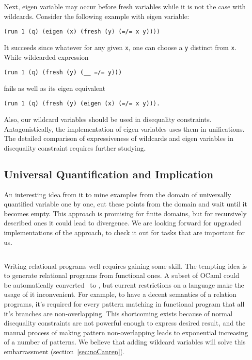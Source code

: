 Next, eigen variable may occur before fresh variables while it is not the case with wildcards.
Consider the following example with eigen variable: 
\begin{lstlisting}[xleftmargin=0.5cm]
(run 1 (q) (eigen (x) (fresh (y) (=/= x y))))
\end{lstlisting}
It succeeds since whatever for any given \lstinline{x}, one can choose a \lstinline{y} distinct from \lstinline{x}.
While wildcarded expression 
\begin{lstlisting}[xleftmargin=1cm]
(run 1 (q) (fresh (y) (__ =/= y)))
\end{lstlisting}
fails as well as its eigen equivalent 
\begin{lstlisting}[xleftmargin=0.5cm]
(run 1 (q) (fresh (y) (eigen (x) (=/= x y))).
\end{lstlisting}

Also, our wildcard variables should be used in disequality constraints.
Antagonistically, the implementation of eigen variables uses them in unifications. 
The detailed comparison of expressiveness of wildcards and eigen variables in disequality constraint requires further studying. 
  
\subsection{Universal Quantification and Implication}

An interesting idea from \cite{universal2021} it to mine examples from the domain of universally quantified variable one by one, cut these points from the domain and wait until it becomes empty. This approach is promising for finite domains, but for recursively described ones it could lead to divergence. We are looking forward for upgraded implementations of the approach, to check it out for tasks that are important for us. 

\subsection{\noCanren{}}

Writing relational programs well requires gaining some skill. The tempting idea is to generate relational programs from functional ones. 
A subset of OCaml could be automatically converted~\cite{RelConversion} to \OCanren{}, but current restrictions on a language make the usage of it inconvenient. For example, to have a decent semantics of a relation programs, it's required for every pattern matching in functional program that all it's branches are non-overlapping. This shortcoming exists because of normal disequality constraints are not powerful enough to express desired result, and the manual process of making pattern non-overlapping leads to exponential increasing of a number of patterns. We believe that adding wildcard variables will solve this embarrassment (section~\ref{sec:noCanren}).

